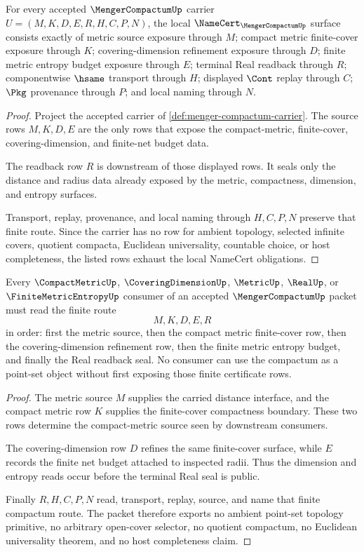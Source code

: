 \begin{theorem}
\label{thm:menger-compactum-namecert-obligations}
For every accepted $\MengerCompactumUp$ carrier $U=(M,K,D,E,R,H,C,P,N)$, the local $\NameCert_{\MengerCompactumUp}$ surface consists exactly of metric source exposure through $M$; compact metric finite-cover exposure through $K$; covering-dimension refinement exposure through $D$; finite metric entropy budget exposure through $E$; terminal Real readback through $R$; componentwise $\hsame$ transport through $H$; displayed $\Cont$ replay through $C$; $\Pkg$ provenance through $P$; and local naming through $N$.
\end{theorem}
\begin{proof}
Project the accepted carrier of \autoref{def:menger-compactum-carrier}. The source rows $M,K,D,E$ are the only rows that expose the compact-metric, finite-cover, covering-dimension, and finite-net budget data.

The readback row $R$ is downstream of those displayed rows. It seals only the distance and radius data already exposed by the metric, compactness, dimension, and entropy surfaces.

Transport, replay, provenance, and local naming through $H,C,P,N$ preserve that finite route. Since the carrier has no row for ambient topology, selected infinite covers, quotient compacta, Euclidean universality, countable choice, or host completeness, the listed rows exhaust the local NameCert obligations.
\end{proof}

\begin{theorem}
\label{thm:menger-compactum-finite-cover-handoff}
Every $\CompactMetricUp$, $\CoveringDimensionUp$, $\MetricUp$, $\RealUp$, or $\FiniteMetricEntropyUp$ consumer of an accepted $\MengerCompactumUp$ packet must read the finite route
$$
M,K,D,E,R
$$
in order: first the metric source, then the compact metric finite-cover row, then the covering-dimension refinement row, then the finite metric entropy budget, and finally the Real readback seal. No consumer can use the compactum as a point-set object without first exposing those finite certificate rows.
\end{theorem}
\begin{proof}
The metric source $M$ supplies the carried distance interface, and the compact metric row $K$ supplies the finite-cover compactness boundary. These two rows determine the compact-metric source seen by downstream consumers.

The covering-dimension row $D$ refines the same finite-cover surface, while $E$ records the finite net budget attached to inspected radii. Thus the dimension and entropy reads occur before the terminal Real seal is public.

Finally $R,H,C,P,N$ read, transport, replay, source, and name that finite compactum route. The packet therefore exports no ambient point-set topology primitive, no arbitrary open-cover selector, no quotient compactum, no Euclidean universality theorem, and no host completeness claim.
\end{proof}

